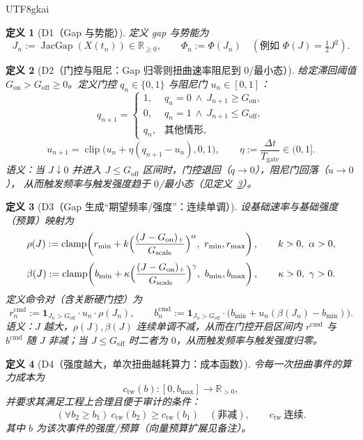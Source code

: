 \documentclass[12pt]{article}
\newtheorem{definition}{定义}[section]
\newcommand{\RR}{\mathbb{R}}
\newcommand{\JacGap}{\operatorname{JacGap}}
\newcommand{\indicator}[1]{\mathbf{1}_{#1}}
\newcommand{\clip}{\operatorname{clip}}
\newcommand{\clamp}{\operatorname{clamp}}
\begin{document}
\begin{CJK*}{UTF8}{gkai}
\begin{definition}[D1（Gap 与势能）]
\label{def:tex28-ch2-d1}
定义 gap 与势能为
\[
  J_n:=\JacGap(X(t_n))\in\RR_{\ge 0},
  \qquad
  \Phi_n:=\Phi(J_n)
  \quad(\text{例如 }\Phi(J)=\tfrac12 J^2).
\]
\end{definition}

\begin{definition}[D2（门控与阻尼：Gap 归零则扭曲速率阻尼到 0/最小态）]
\label{def:tex28-ch2-d2}
给定滞回阈值 $G_{\mathrm{on}}>G_{\mathrm{off}}\ge 0$。定义门控 $q_n\in\{0,1\}$ 与阻尼门 $u_n\in[0,1]$：
\[
  q_{n+1}=
  \begin{cases}
    1, & q_n=0\ \wedge\ J_{n+1}\ge G_{\mathrm{on}},\\
    0, & q_n=1\ \wedge\ J_{n+1}\le G_{\mathrm{off}},\\
    q_n, & \text{其他情形},
  \end{cases}
\]
\[
  u_{n+1}=\clip\bigl(u_n+\eta(q_{n+1}-u_n),0,1\bigr),
  \qquad
  \eta:=\frac{\Delta t}{T_{\mathrm{gate}}}\in(0,1].
\]
语义：当 $J\downarrow 0$ 并进入 $J\le G_{\mathrm{off}}$ 区间时，门控退回（$q\to 0$），阻尼门回落（$u\to 0$），
从而触发频率与触发强度趋于 $0$/最小态（见定义~\ref{def:tex28-ch2-d3}）。
\end{definition}

\begin{definition}[D3（Gap 生成“期望频率/强度”：连续单调）]
\label{def:tex28-ch2-d3}
设基础速率与基础强度（预算）映射为
\[
  \rho(J):=\clamp\!\left(
  r_{\min}+k\Bigl(\frac{(J-G_{\mathrm{on}})_{+}}{G_{\mathrm{scale}}}\Bigr)^{\alpha},\ r_{\min},r_{\max}\right),
  \qquad
  k>0,\ \alpha>0,
\]
\[
  \beta(J):=\clamp\!\left(
  b_{\min}+\kappa\Bigl(\frac{(J-G_{\mathrm{on}})_{+}}{G_{\mathrm{scale}}}\Bigr)^{\gamma},\ b_{\min},b_{\max}\right),
  \qquad
  \kappa>0,\ \gamma>0.
\]
定义命令对（含关断硬门控）为
\[
  r^{\mathrm{cmd}}_n := \indicator{J_n>G_{\mathrm{off}}}\cdot u_n\cdot \rho(J_n),
  \qquad
  b^{\mathrm{cmd}}_n := \indicator{J_n>G_{\mathrm{off}}}\cdot\bigl(b_{\min}+u_n(\beta(J_n)-b_{\min})\bigr).
\]
语义：$J$ 越大，$\rho(J),\beta(J)$ 连续单调不减，从而在门控开启区间内
$r^{\mathrm{cmd}}$ 与 $b^{\mathrm{cmd}}$ 随 $J$ 非减；当 $J\le G_{\mathrm{off}}$ 时二者为 $0$，从而触发频率与触发强度归零。
\end{definition}

\begin{definition}[D4（强度越大，单次扭曲越耗算力：成本函数）]
\label{def:tex28-ch2-d4}
令每一次扭曲事件的算力成本为
\[
  c_{\mathrm{tw}}(b):[0,b_{\max}]\to\RR_{>0},
\]
并要求其满足工程上合理且便于审计的条件：
\[
  (\forall b_2\ge b_1)\ c_{\mathrm{tw}}(b_2)\ge c_{\mathrm{tw}}(b_1)\quad(\text{非减}),
  \qquad
  c_{\mathrm{tw}}\ \text{连续}.
\]
其中 $b$ 为该次事件的强度/预算（向量预算扩展见备注）。
\end{definition}


\end{CJK*}
\end{document}

